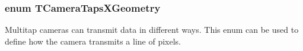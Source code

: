 \hypertarget{group___device_specific_interface_ga25ba65893f1ee0e7de99cb51bb858d99}{
\subsubsection[{T\+Camera\+Taps\+X\+Geometry}]{\setlength{\rightskip}{0pt plus 5cm}enum {\bf T\+Camera\+Taps\+X\+Geometry}}}\label{group___device_specific_interface_ga25ba65893f1ee0e7de99cb51bb858d99}


Multitap cameras can transmit data in different ways. This enum can be used to define how the camera transmits a line of pixels. 

